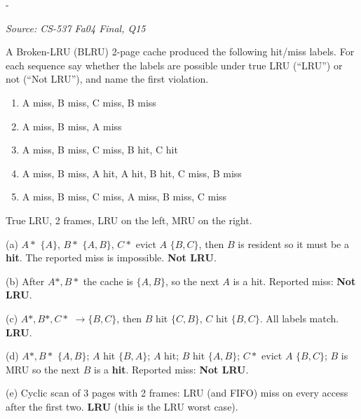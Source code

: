 \documentclass[11pt,a4paper]{article}
\makeatletter
\newcommand{\keepspace}[1]{\par\penalty-100\begingroup
  \setlength{\dimen@}{#1}\dimen@ii\pagegoal\advance\dimen@ii-\pagetotal
  \ifdim\dimen@>\dimen@ii\ifdim\dimen@ii>\z@\vfil\fi\break\fi\endgroup}
\newcounter{qn}[section]
\newenvironment{Qn}[4]{%
  \refstepcounter{qn}\keepspace{7\baselineskip}%
  \begin{tcolorbox}[qboxstyle, title={Q\thesection.\theqn\ \ [#1 \textbar\ #2]\ \ #4}]%
  {\footnotesize\color{g3}\textit{Source: #3}}\par\smallskip%
}{%
  \end{tcolorbox}%
}
\newenvironment{Sol}{%
  \begin{tcolorbox}[sboxstyle, title={Solution}]%
}{%
  \end{tcolorbox}\vspace{0.35em}%
}
\makeatother
\begin{document}
\begin{Qn}{Medium-Hard}{Lect 15}{CS-537 Fa04 Final, Q15}{Broken LRU: which traces a 2-frame cache may not produce}
A Broken-LRU (BLRU) 2-page cache produced the following
hit/miss labels. For each sequence say whether the labels are possible
under true LRU (``LRU'') or not (``Not LRU''), and name the first
violation.
\begin{enumerate}
  \item[(a)] A miss, B miss, C miss, B miss
  \item[(b)] A miss, B miss, A miss
  \item[(c)] A miss, B miss, C miss, B hit, C hit
  \item[(d)] A miss, B miss, A hit, A hit, B hit, C miss, B miss
  \item[(e)] A miss, B miss, C miss, A miss, B miss, C miss
\end{enumerate}
\end{Qn}
\begin{Sol}
True LRU, 2 frames, LRU on the left, MRU on the right.

(a) $A*$ $\{A\}$, $B*$ $\{A,B\}$, $C*$ evict $A$ $\{B,C\}$, then $B$
is resident so it must be a \textbf{hit}. The reported miss is
impossible. \textbf{Not LRU}.

(b) After $A*,B*$ the cache is $\{A,B\}$, so the next $A$ is a hit.
Reported miss: \textbf{Not LRU}.

(c) $A*,B*,C*$ $\to\{B,C\}$, then $B$ hit $\{C,B\}$, $C$ hit $\{B,C\}$.
All labels match. \textbf{LRU}.

(d) $A*,B*$ $\{A,B\}$; $A$ hit $\{B,A\}$; $A$ hit; $B$ hit $\{A,B\}$;
$C*$ evict $A$ $\{B,C\}$; $B$ is MRU so the next $B$ is a
\textbf{hit}. Reported miss: \textbf{Not LRU}.

(e) Cyclic scan of 3 pages with 2 frames: LRU (and FIFO) miss on every
access after the first two. \textbf{LRU} (this is the LRU worst case).
\end{Sol}
\end{document}
